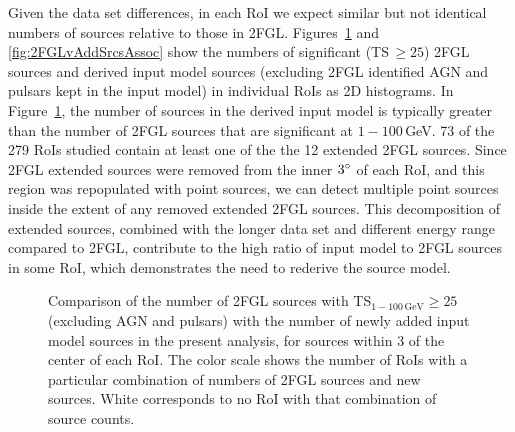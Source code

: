 Given the data set differences, in each RoI we expect similar but not identical numbers of sources relative to those in 2FGL.
Figures~\ref{fig:2FGLvAddSrcs} and \ref{fig:2FGLvAddSrcsAssoc} show the numbers of significant (TS\,$\geq 25$) 2FGL sources and derived input model sources (excluding 2FGL identified AGN and pulsars kept in the input model) in individual RoIs as 2D histograms. In Figure~\ref{fig:2FGLvAddSrcs}, the number of sources in the derived input model is typically greater than the number of 2FGL sources that are significant at $1-100$\,GeV. 73 of the 279 RoIs studied contain at least one of the the 12 extended 2FGL sources. Since 2FGL extended sources were removed from the inner $3\mbox{$^\circ$}$ of each RoI, and this region was repopulated with point sources, we can detect multiple point sources inside the extent of any removed extended 2FGL sources. This decomposition of extended sources, combined with the longer data set and different energy range compared to 2FGL, contribute to the high ratio of input model to 2FGL sources in some RoI, which demonstrates the need to rederive the source model. 

\begin{figure}[h!]
	\centering
	\caption[Comparison of the number of 2FGL sources with with the number of newly added input model sources.]{Comparison of the number of 2FGL sources with TS$_{1-100\,\mathrm{GeV}} \geq 25$ (excluding AGN and pulsars) with the number of newly added input model sources in the present analysis, for sources within $3$\degr{} of the center of each RoI. The color scale shows the number of RoIs with a particular combination of numbers of 2FGL sources and new sources. White corresponds to no RoI with that combination of source counts.}
	\label{fig:2FGLvAddSrcs} 
\end{figure}

